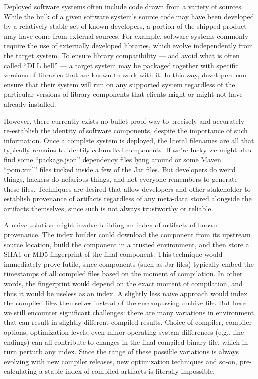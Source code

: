 \label{chapter:introduction}


Deployed software systems often include code drawn from a variety of sources.
While the bulk of a given software system’s source code may have been developed
by a relatively stable set of known developers, a portion of the shipped product
may have come from external sources. For example, software systems commonly
require the use of externally developed libraries, which evolve independently
from the target system. To ensure library compatibility — and avoid what is often
called “DLL hell” — a target system may be packaged together with specific versions
of libraries that are known to work with it. In this way, developers can ensure that
their system will run on any supported system regardless of the particular versions
of library components that clients might or might not have already installed.

However, there currently exists no bullet-proof way to precisely and accurately
re-establish the identity of software components, despite the importance of such
information.  Once a complete system is deployed, the literal filenames are all that
typically remains to identify cobundled components. If we’re lucky we might also find
some “package.json” dependency files lying around or some Maven “pom.xml” files tucked
inside a few of the Jar files.  But developers do weird things, hackers do nefarious
things, and not everyone remembers to generate these files. Techniques are desired
that allow developers and other stakeholder to establish provenance of artifacts
regardless of any meta-data stored alongside the artifacts themselves, since such
is not always trustworthy or reliable.

A naive solution might involve building an index of artifacts of known provenance.
The index builder could download the component from its upstream source location,
build the component in a trusted environment, and then store a SHA1 or MD5 fingerprint
of the final component.  This technique would immediately prove futile, since components
(such as Jar files) typically embed the timestamps of all compiled files based on the
moment of compilation. In other words, the fingerprint would depend on the exact moment
of compilation, and thus it would be useless as an index.  A slightly less naive approach
would index the compiled files themselves instead of the encompassing archive file.
But here we still encounter significant challenges: there are many variations in environment
that can result in slightly different compiled results. Choice of compiler, compiler options,
optimization levels, even minor operating system differences (e.g., line endings) can all
contribute to changes in the final compiled binary file, which in turn perturb any index.
Since the range of these possible variations is always evolving with new compiler releases,
new optimization techniques and so-on, pre-calculating a stable index of compiled artifacts
is literally impossible.


